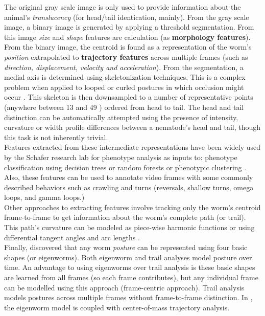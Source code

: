 \documentclass[main.tex]{subfiles}
\begin{document}
The original gray scale image is only used to provide information about the animal's \textit{translucency} (for head/tail identication, mainly). From the gray scale image, a binary image is generated by applying a threshold segmentation. From this image \textit{size} and \textit{shape} features are calculation (as \textbf{morphology features}). From the binary image, the centroid is found as a representation of the worm's \textit{position} extrapolated to \textbf{trajectory features} across multiple frames (such as \textit{direction, displacement, velocity and acceleration}). From the segmentation, a medial axis is determined using skeletonization techniques. This is a complex problem when applied to looped or curled postures in which occlusion might occur \cite{huang2006}. This skeleton is then downsampled to a number of representative points (anywhere between 13 \cite{cronin2005} and 49 \cite{yemini2013}) ordered from head to tail. The head and tail distinction can be automatically attempted using the presence of intensity, curvature or width profile differences between a nematode's head and tail, though this task is not inherently trivial.\\

Features extracted from these intermediate representations have been widely used by the Schafer research lab for phenotype analysis as inputs to: phenotype classification using decision trees \cite{baek2002} or random forests \cite{geng2004} or phenotypic clustering \cite{geng2003}. Also, these features can be used to annotate video frames with some commonly described behaviors such as crawling and turns (reversals, shallow turns, omega loops, and gamma loops.)\\

Other approaches to extracting features involve tracking only the worm's centroid frame-to-frame to get information about the worm's complete path (or trail). This path's curvature can be modeled as piece-wise harmonic functions \cite{padmanabhan2012} or using differential tangent angles and arc lengths \cite{kim2011}. \\

Finally, \cite{stephens2008} discovered that any worm \textit{posture} can be represented using four basic shapes (or eigenworms). Both eigenworm and trail analyses model posture over time. An advantage to using eigenworms over trail analysis is these basic shapes are learned from all frames (so each frame contributes), but any individual frame can be modelled using this approach (frame-centric approach). Trail analysis models postures across multiple frames without frame-to-frame distinction. In \cite{stephens2010}, the eigenworm model is coupled with center-of-mass trajectory analysis. \\
\end{document}
